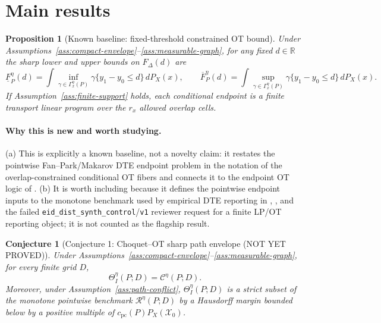 \documentclass[11pt]{article}
\theoremstyle{definition}
\theoremstyle{plain}
\newtheorem{conjecture}{Conjecture}
\newtheorem{proposition}{Proposition}
\theoremstyle{remark}
\begin{document}
\section{Main results}
\begin{proposition}[Known baseline: fixed-threshold constrained OT bound]\label{prop:fixed-d-ot}
Under Assumptions~\ref{ass:compact-envelope}--\ref{ass:measurable-graph}, for any fixed
\(d\in\mathbb R\) the sharp lower and upper bounds on \(F_\Delta(d)\) are
\[
\underline F^\eta_P(d)=\int \inf_{\gamma\in\Gamma^\eta_x(P)}
\gamma\{y_1-y_0\le d\}\,dP_X(x),\qquad
\overline F^\eta_P(d)=\int \sup_{\gamma\in\Gamma^\eta_x(P)}
\gamma\{y_1-y_0\le d\}\,dP_X(x).
\]
If Assumption~\ref{ass:finite-support} holds, each conditional endpoint is a finite
transport linear program over the \(r_x\) allowed overlap cells.
\end{proposition}

\paragraph{Why this is new and worth studying.}
(a) This is explicitly a known baseline, not a novelty claim: it restates the
pointwise Fan--Park/Makarov DTE endpoint problem in the notation of the
overlap-constrained conditional OT fibers and connects it to the endpoint OT logic of
\citet{OberReynolds2023}.  (b) It is worth including because it defines the pointwise
endpoint inputs to the monotone benchmark used by empirical DTE reporting in
\citet{FanPark2010}, \citet{Lee2024}, and the failed
\texttt{eid\_dist\_synth\_control}/\texttt{v1} reviewer request for a finite LP/OT
reporting object; it is not counted as the flagship result.

\begin{conjecture}[Conjecture 1: Choquet--OT sharp path envelope (NOT YET PROVED)]\label{conj:choquet-ot-envelope}
Under Assumptions~\ref{ass:compact-envelope}--\ref{ass:measurable-graph}, for every
finite grid \(D\),
\[
\Theta_I^\eta(P;D)=\mathcal C^\eta(P;D).
\]
Moreover, under Assumption~\ref{ass:path-conflict}, \(\Theta_I^\eta(P;D)\) is a strict
subset of the monotone pointwise benchmark \(\mathcal R^\eta(P;D)\) by a Hausdorff
margin bounded below by a positive multiple of
\(c_{\mathrm{pc}}(P)P_X(\mathcal X_0)\).
\end{conjecture}
\end{document}
